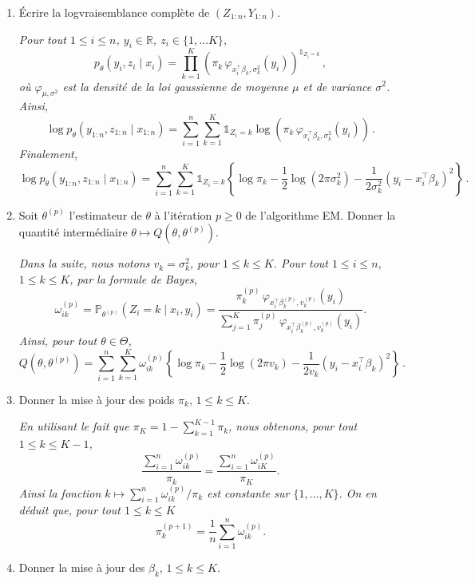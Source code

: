 \documentclass[a4paper,10pt,fleqn]{article}
\newcommand{\eqsp}{\,}
\newcommand{\1}{\ensuremath{\mathbbm{1}}}
\begin{document}
\begin{enumerate}
\item \'Ecrire la logvraisemblance compl\`ete de $(Z_{1:n},Y_{1:n})$.

\vspace{.2cm}
{\em
Pour tout $1\leq i \leq n$, $y_i\in\mathbb{R}$, $z_i\in\{1,\ldots K\}$,
$$
p_\theta(y_i,z_i\mid x_i)=\prod_{k=1}^K\left(\pi_k\,\varphi_{x_i^\top\beta_k,\sigma_k^2}(y_i)\right)^{\mathds{1}_{Z_i=k}}\eqsp,
$$
o\`u $\varphi_{\mu,\sigma^2}$ est la densit\'e de la loi gaussienne de moyenne $\mu$ et de variance $\sigma^2$.
Ainsi,
$$
\log p_\theta(y_{1:n},z_{1:n}\mid x_{1:n})=\sum_{i=1}^n\sum_{k=1}^K \mathds{1}_{Z_i=k} \log \left(\pi_k\,\varphi_{x_i^\top\beta_k,\sigma_k^2}(y_i)\right)\eqsp.
$$
Finalement,
$$
\log p_\theta(y_{1:n},z_{1:n}\mid x_{1:n})=\sum_{i=1}^n\sum_{k=1}^K \mathds{1}_{Z_i=k} \left\{ \log \pi_k - \frac{1}{2} \log (2\pi \sigma_k^2) - \frac{1}{2\sigma_k^2}\left(y_i - x_i^\top \beta_k\right)^2\right\}\eqsp.
$$
}

\item Soit $\theta^{(p)}$ l'estimateur de $\theta$ \`a l'it\'eration $p\geq 0$ de l'algorithme EM.  Donner la quantit\'e interm\'ediaire $\theta\mapsto Q(\theta,\theta^{(p)})$.

\vspace{.2cm}
{\em
Dans la suite, nous notons $v_k = \sigma_k^2$, pour $1\leq k \leq K$. Pour tout $1\leq i \leq n$, $1\leq k \leq K$, par la formule de Bayes,
$$
\omega_{ik}^{(p)} = \mathbb{P}_{\theta^{(p)}}(Z_i=k\mid x_i,y_i) = \frac{\pi_k^{(p)}\,\varphi_{x_i^\top\beta^{(p)}_k,v_k^{(p)}}(y_i)}{\sum_{j=1}^K \pi_j^{(p)}\,\varphi_{x_i^\top\beta^{(p)}_k,v_k^{(p)}}(y_i)}.
$$
Ainsi, pour tout $\theta\in\Theta$,
$$
Q(\theta,\theta^{(p)}) = \sum_{i=1}^n\sum_{k=1}^K \omega_{ik}^{(p)}\left\{ \log \pi_k - \frac{1}{2} \log (2\pi v_k) - \frac{1}{2v_k}\left(y_i - x_i^\top \beta_k\right)^2\right\} \eqsp.
$$
}
\item Donner la mise \`a jour des poids $\pi_k$,  $1\leq k \leq K$.

\vspace{.2cm}
{\em
En utilisant le fait que $\pi_K = 1 - \sum_{k=1}^{K-1}\pi_k$, nous obtenons, pour tout $1\leq k \leq K-1$,
$$
\frac{\sum_{i=1}^n \omega_{ik}^{(p)}}{\pi_k} = \frac{\sum_{i=1}^n \omega_{iK}^{(p)}}{\pi_K}. 
$$
Ainsi la fonction $k\mapsto \sum_{i=1}^n \omega_{ik}^{(p)}/\pi_k$ est constante sur $\{1,\ldots, K\}$. On en d\'eduit que, pour tout $1\leq k \leq K$
$$
\pi^{(p+1)}_k = \frac{1}{n}\sum_{i=1}^n \omega_{ik}^{(p)}.
$$ 
}
\item Donner la mise \`a jour des $\beta_k$, $1\leq k \leq K$.


\end{enumerate}
\end{document}
